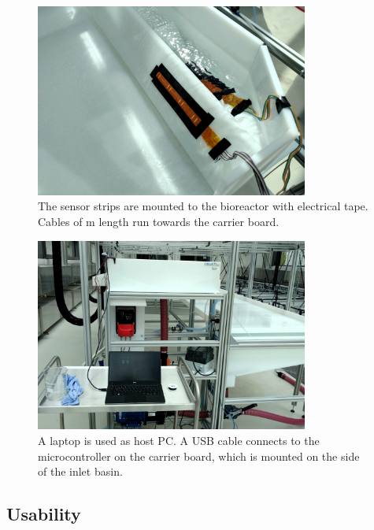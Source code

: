 \begin{figure}[H]
	\begin{center}
		\includegraphics[width=0.8\textwidth]{images/stripsinreactor.jpg} 
		\caption{The sensor strips are mounted to the bioreactor with electrical tape. Cables of \unit[1]{m} length run towards the carrier board.}
	\label{fig:stripsr}
	\end{center}
\end{figure}

\begin{figure}[H]
	\begin{center}
		\includegraphics[width=0.8\textwidth]{images/pconreactor.jpg} 
		\caption{A laptop is used as host PC. A USB cable connects to the microcontroller on the carrier board, which is mounted on the side of the inlet basin.}
	\label{fig:pcr}
	\end{center}
\end{figure}

\subsection{Usability}

